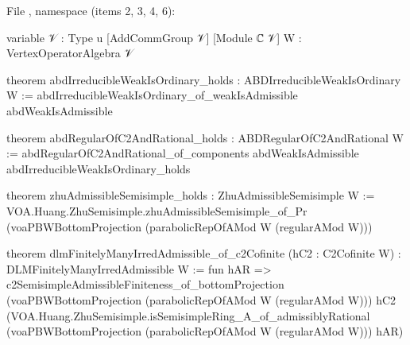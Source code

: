 \noindent File , namespace
 (items 2, 3, 4, 6):
\begin{leancode}
variable {𝒱 : Type u} [AddCommGroup 𝒱] [Module ℂ 𝒱] {W : VertexOperatorAlgebra 𝒱}

theorem abdIrreducibleWeakIsOrdinary_holds : ABDIrreducibleWeakIsOrdinary W :=
  abdIrreducibleWeakIsOrdinary_of_weakIsAdmissible abdWeakIsAdmissible

theorem abdRegularOfC2AndRational_holds : ABDRegularOfC2AndRational W :=
  abdRegularOfC2AndRational_of_components abdWeakIsAdmissible
    abdIrreducibleWeakIsOrdinary_holds

theorem zhuAdmissibleSemisimple_holds : ZhuAdmissibleSemisimple W :=
  VOA.Huang.ZhuSemisimple.zhuAdmissibleSemisimple_of_Pr
    (voaPBWBottomProjection (parabolicRepOfAMod W (regularAMod W)))

theorem dlmFinitelyManyIrredAdmissible_of_c2Cofinite (hC2 : C2Cofinite W) :
    DLMFinitelyManyIrredAdmissible W := fun hAR =>
  c2SemisimpleAdmissibleFiniteness_of_bottomProjection
    (voaPBWBottomProjection (parabolicRepOfAMod W (regularAMod W))) hC2
    (VOA.Huang.ZhuSemisimple.isSemisimpleRing_A_of_admissiblyRational
      (voaPBWBottomProjection (parabolicRepOfAMod W (regularAMod W))) hAR)
\end{leancode}

